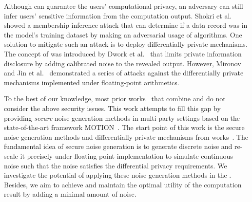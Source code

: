 Although \smpc can guarantee the users' computational privacy, an adversary can still infer users' sensitive information from the computation output. Shokri et al.~\cite{shokri2017membership} showed a membership inference attack that can determine if a data record was in the model's training dataset by making an adversarial usage of \machinelearning algorithms. One solution to mitigate such an attack is to deploy differentially private mechanisms. The concept of \differentialprivacy was introduced by Dwork et al.~\cite{dwork2006differential, dwork2006calibrating} that limits private information disclosure by adding calibrated noise to the revealed output.
However, Mironov~\cite{mironov2012significance} and Jin et al.~\cite{jin2022we} demonstrated a series of attacks against the differentially private mechanisms implemented under floating-point arithmetics.

To the best of our knowledge, most prior works~\cite{rastogi2010differentially,Elaine2011Privacy,acs2011have,chan2012privacy,eigner2014differentially,wu2016inherit,bindschaedler2017achieving,jayaraman2018distributed,truex2019hybrid,knott2021crypten,yuan2021practical} that combine \smpc and \differentialprivacy do not consider the above security issues.
This work attempts to fill this gap by providing \textit{secure} noise generation methods in multi-party settings based on the state-of-the-art \smpc framework MOTION~\cite{braun2022motion}.
The start point of this work is the secure noise generation methods and differentially private mechanisms from works~\cite{mironov2012significance,googleDP2019,canonne2020discrete}.
The fundamental idea of secure noise generation is to generate discrete noise and re-scale it precisely under floating-point implementation to simulate continuous noise such that the noise satisfies the differential privacy requirements.
We investigate the potential of applying these noise generation methods in the \smpc.
Besides, we aim to achieve \differentialprivacy and maintain the optimal utility of the computation result by adding a minimal amount of noise.

